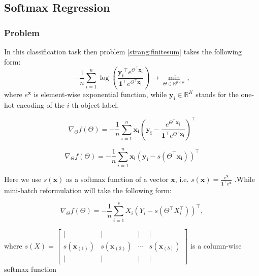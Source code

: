 \documentclass{article}
\newcommand{\vect}[1]{\boldsymbol{\mathbf{#1}}}
\begin{document}
\subsection{Softmax Regression}
\subsubsection{Problem}
In this classification task then problem \eqref{strang:finitesum} takes the following form:
\begin{equation}\label{strang:Softmax}
-\frac{1}{n} \sum_{i=1}^n\log\left(\frac{\vect{y_i}^\top e^{\Theta^\top \vect{x_i}}}{\vect{1}^\top e^{\Theta^\top \vect{x_i}}}\right) \to \min_{\Theta \in \mathbb{R}^{p \times K}},
\end{equation}
where $e^{\vect{x}}$ is element-wise exponential function, while $ \vect{y_i} \in \mathbb{R}^K$ stands for the one-hot encoding of the $i$-th object label.

\begin{equation}
\nabla_\Theta f(\Theta) = -\frac{1}{n} \sum_{i=1}^n\vect{x_i}\left(\vect{y_i} - \frac{ e^{\Theta^\top \vect{x_i}}}{\vect{1}^\top e^{\Theta^\top \vect{x_i}}}\right)^\top
\end{equation}

\begin{equation}
\nabla_\Theta f(\Theta) = -\frac{1}{n} \sum_{i=1}^n\vect{x_i}\left(\vect{y_i} - s\left(\Theta^\top \vect{x_i}\right)\right)^\top
\end{equation}


Here we use $s(\vect{x})$ as a softmax function of a vector $\vect{x}$, i.e. $s(\vect{x}) = \frac{e^{\vect{x}}}{\vect{1}^\top e^{\vect{x}}}$ .While mini-batch reformulation will take the following form:

\begin{equation}
\nabla_\Theta f(\Theta) = -\frac{1}{n} \sum_{i=1}^s X_i\left(Y_i - s(\Theta^\top X_i^\top)\right)^\top,
\end{equation}

where $s(X) = \left[\begin{array}{cccc}| & | & | & | \\
s(\vect{x}_{(1)}) & s(\vect{x}_{(2)}) & \cdots & s(\vect{x}_{(b)}) \\
| & | & | & |
\end{array}\right]$ is a column-wise softmax function
\end{document}
